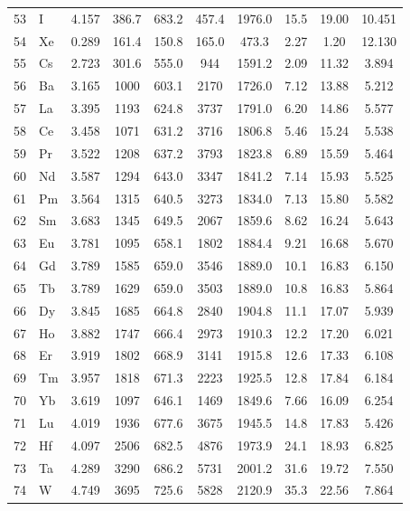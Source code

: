 \documentclass[12pt,a4paper]{article}
\theoremstyle{remark}
\begin{document}
\begin{longtable}{@{}llcccccccc@{}}
		53 & I   & 4.157 & 386.7  & 683.2  & 457.4  & 1976.0 & 15.5  & 19.00 & 10.451 \\
		54 & Xe  & 0.289 & 161.4  & 150.8  & 165.0  & 473.3  & 2.27  & 1.20  & 12.130 \\
		55 & Cs  & 2.723 & 301.6  & 555.0  & 944    & 1591.2 & 2.09  & 11.32 & 3.894 \\
		56 & Ba  & 3.165 & 1000   & 603.1  & 2170   & 1726.0 & 7.12  & 13.88 & 5.212 \\
		57 & La  & 3.395 & 1193   & 624.8  & 3737   & 1791.0 & 6.20  & 14.86 & 5.577 \\
		58 & Ce  & 3.458 & 1071   & 631.2  & 3716   & 1806.8 & 5.46  & 15.24 & 5.538 \\
		59 & Pr  & 3.522 & 1208   & 637.2  & 3793   & 1823.8 & 6.89  & 15.59 & 5.464 \\
		60 & Nd  & 3.587 & 1294   & 643.0  & 3347   & 1841.2 & 7.14  & 15.93 & 5.525 \\
		61 & Pm  & 3.564 & 1315   & 640.5  & 3273   & 1834.0 & 7.13  & 15.80 & 5.582 \\
		62 & Sm  & 3.683 & 1345   & 649.5  & 2067   & 1859.6 & 8.62  & 16.24 & 5.643 \\
		63 & Eu  & 3.781 & 1095   & 658.1  & 1802   & 1884.4 & 9.21  & 16.68 & 5.670 \\
		64 & Gd  & 3.789 & 1585   & 659.0  & 3546   & 1889.0 & 10.1  & 16.83 & 6.150 \\
		65 & Tb  & 3.789 & 1629   & 659.0  & 3503   & 1889.0 & 10.8  & 16.83 & 5.864 \\
		66 & Dy  & 3.845 & 1685   & 664.8  & 2840   & 1904.8 & 11.1  & 17.07 & 5.939 \\
		67 & Ho  & 3.882 & 1747   & 666.4  & 2973   & 1910.3 & 12.2  & 17.20 & 6.021 \\
		68 & Er  & 3.919 & 1802   & 668.9  & 3141   & 1915.8 & 12.6  & 17.33 & 6.108 \\
		69 & Tm  & 3.957 & 1818   & 671.3  & 2223   & 1925.5 & 12.8  & 17.84 & 6.184 \\
		70 & Yb  & 3.619 & 1097   & 646.1  & 1469   & 1849.6 & 7.66  & 16.09 & 6.254 \\
		71 & Lu  & 4.019 & 1936   & 677.6  & 3675   & 1945.5 & 14.8  & 17.83 & 5.426 \\
		72 & Hf  & 4.097 & 2506   & 682.5  & 4876   & 1973.9 & 24.1  & 18.93 & 6.825 \\
		73 & Ta  & 4.289 & 3290   & 686.2  & 5731   & 2001.2 & 31.6  & 19.72 & 7.550 \\
		74 & W   & 4.749 & 3695   & 725.6  & 5828   & 2120.9 & 35.3  & 22.56 & 7.864 \\

\end{longtable}
\end{document}
